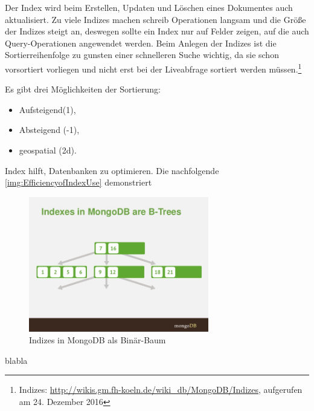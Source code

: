 Der Index wird beim Erstellen, Updaten und Löschen eines Dokumentes auch aktualisiert. Zu viele Indizes machen schreib Operationen langsam und die Größe der Indizes steigt an, deswegen sollte ein Index nur auf Felder zeigen, auf die auch Query-Operationen angewendet werden. Beim Anlegen der Indizes ist die Sortierreihenfolge zu gunsten einer schnelleren Suche wichtig, da sie schon vorsortiert vorliegen und nicht erst bei der Liveabfrage sortiert werden müssen.\footnote{Indizes: \url{http://wikis.gm.fh-koeln.de/wiki_db/MongoDB/Indizes}, aufgerufen am 24. Dezember 2016}

Es gibt drei Möglichkeiten der Sortierung:

\begin{itemize}
\item Aufsteigend(1),
\item Absteigend (-1),
\item geospatial (2d).
\end{itemize}

Index hilft, Datenbanken zu optimieren. Die nachfolgende \autoref{img:EfficiencyofIndexUse} demonstriert

\begin{figure}
\centering
	\includegraphics[width=0.7\textwidth]{resources/indexingBtree}
\caption[Indizes in MongoDB als Binär-Baum]{Indizes in MongoDB als Binär-Baum\protect\footnotemark}
\label{img:IndexesInMongoDBAreB-Trees}
\end{figure}

blabla

